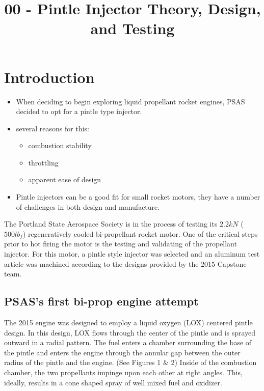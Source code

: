 \documentclass[11pt]{article}
\title{00 - Pintle Injector Theory, Design, and Testing}
\providecommand{\tightlist}{%
      \setlength{\itemsep}{0pt}\setlength{\parskip}{0pt}}
\begin{document}
    
    
    \maketitle
    
    

    
    \section{Introduction}\label{introduction}

\begin{itemize}
\tightlist
\item
  When deciding to begin exploring liquid propellant rocket engines,
  PSAS decided to opt for a pintle type injector.
\item
  several reasons for this:

  \begin{itemize}
  \tightlist
  \item
    combustion stability
  \item
    throttling
  \item
    apparent ease of design
  \end{itemize}
\item
  Pintle injectors can be a good fit for small rocket motors, they have
  a number of challenges in both design and manufacture.
\end{itemize}

The Portland State Aerospace Society is in the process of testing its
\(2.2kN\) (\(500 lb_f\)) regeneratively cooled bi-propellant rocket
motor. One of the critical steps prior to hot firing the motor is the
testing and validating of the propellant injector. For this motor, a
pintle style injector was selected and an aluminum test article was
machined according to the designs provided by the 2015 Capstone team.

\subsection{PSAS's first bi-prop engine
attempt}\label{psass-first-bi-prop-engine-attempt}

The 2015 engine was designed to employ a liquid oxygen (LOX) centered
pintle design. In this design, LOX flows through the center of the
pintle and is sprayed outward in a radial pattern. The fuel enters a
chamber surrounding the base of the pintle and enters the engine through
the annular gap between the outer radius of the pintle and the engine.
(See Figures 1 \& 2) Inside of the combustion chamber, the two
propellants impinge upon each other at right angles. This, ideally,
results in a cone shaped spray of well mixed fuel and oxidizer.
\end{document}
